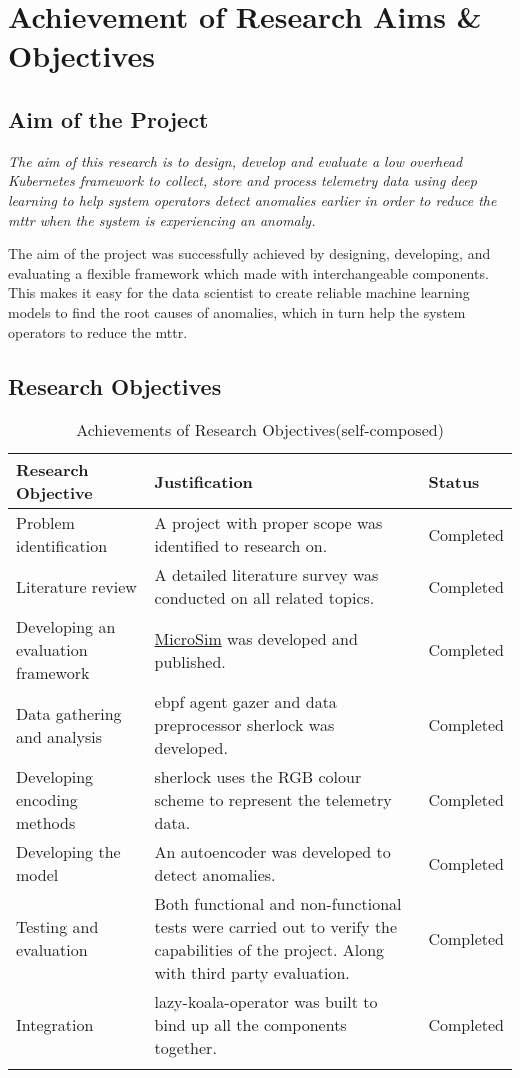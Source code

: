 \section{Achievement of Research Aims \& Objectives}

\subsection{Aim of the Project}

\textit{The aim of this research is to design, develop and evaluate a low overhead Kubernetes framework to collect, store and process telemetry data using deep learning to help system operators detect anomalies earlier in order to reduce the \ac{mttr} when the system is experiencing an anomaly.}

The aim of the project was successfully achieved by designing, developing, and evaluating a flexible framework which made with interchangeable components. This makes it easy for the data scientist to create reliable machine learning models to find the root causes of anomalies, which in turn help the system operators to reduce the \ac{mttr}.


\subsection{Research Objectives}

\begin{longtable}{|p{40mm}|p{91mm}|p{20mm}|}
    \hline
    \textbf{Research Objective} & \textbf{Justification} & \textbf{Status} \\ \hline
    Problem identification & A project with proper scope was identified to research on. & Completed \\ \hline
    Literature review & A detailed literature survey was conducted on all related topics. & Completed \\ \hline
    Developing an evaluation framework & \href{https://github.com/MrSupiri/MicroSim}{MicroSim} was developed and published. & Completed \\ \hline
    Data gathering and analysis & \ac{ebpf} agent \ac{gazer} and data preprocessor \ac{sherlock} was developed. & Completed \\ \hline
    Developing encoding methods & \ac{sherlock} uses the RGB colour scheme to represent the telemetry data. & Completed \\ \hline
    Developing the model & An autoencoder was developed to detect anomalies. & Completed \\ \hline
    Testing and evaluation & Both functional and non-functional tests were carried out to verify the capabilities of the project. Along with third party evaluation. & Completed \\ \hline
    Integration & \ac{lazy-koala-operator} was built to bind up all the components together. & Completed \\ \hline
    \caption{Achievements of Research Objectives(self-composed)}
  \end{longtable}
  
  